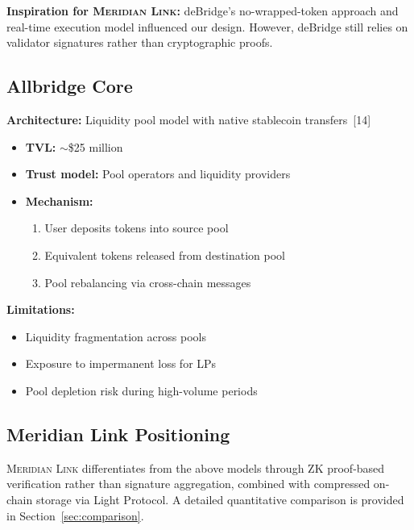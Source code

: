 \documentclass[11pt,a4paper,twoside]{article}
\newcommand{\protocol}{\textsc{Meridian Link}}
\begin{document}
\textbf{Inspiration for \protocol{}:} deBridge's no-wrapped-token approach and real-time execution model influenced our design. However, deBridge still relies on validator signatures rather than cryptographic proofs.

\subsection{Allbridge Core}

\textbf{Architecture:} Liquidity pool model with native stablecoin transfers~[14]

\begin{itemize}
    \item \textbf{TVL:} $\sim$\$25 million
    \item \textbf{Trust model:} Pool operators and liquidity providers
    \item \textbf{Mechanism:}
    \begin{enumerate}
        \item User deposits tokens into source pool
        \item Equivalent tokens released from destination pool
        \item Pool rebalancing via cross-chain messages
    \end{enumerate}
\end{itemize}

\textbf{Limitations:}
\begin{itemize}
    \item Liquidity fragmentation across pools
    \item Exposure to impermanent loss for LPs
    \item Pool depletion risk during high-volume periods
\end{itemize}

\subsection{Meridian Link Positioning}

\protocol{} differentiates from the above models through ZK proof-based verification rather than signature aggregation, combined with compressed on-chain storage via Light Protocol. A detailed quantitative comparison is provided in Section~\ref{sec:comparison}.

\end{document}
